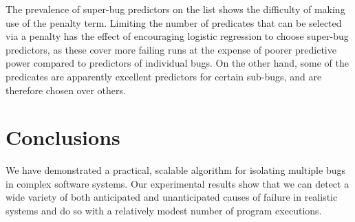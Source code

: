 \documentclass[draft]{sig-alternate}
\newcommand{\issue}[2][]{}
\begin{document}
The prevalence of super-bug predictors on the list shows the
difficulty of making use of the penalty term.  Limiting the number of
predicates that can be selected via a penalty has the effect of
encouraging logistic regression to choose super-bug predictors, as
these cover more failing runs at the expense of poorer predictive
power compared to predictors of individual bugs.  On the other hand,
some of the predicates are apparently excellent predictors for certain
sub-bugs, and are therefore chosen over others.

\issue[Alice]{I changed the justification for why sub-bug predictors
  are selected.  We don't relax the regularization penalty during log
  reg training, but I think sub-bug predictors are selected because
  they are really good predictors for certain subsets of failed runs.
  [text modified]}

\section{Conclusions}
\label{sec:conclusions}

We have demonstrated a practical, scalable algorithm for isolating multiple bugs
in complex software systems.  Our experimental results show that we can
detect a wide variety of both anticipated and unanticipated causes of failure
in realistic systems and do so with a relatively modest number of program
executions.

\issue[Mayur]{Add one or two lines about future work to the end of the
  conclusions section:

  (1) tracking predicates about the heap structure (remember
  rhythmbox)
  
  (2) creating counterexamples (traces) from predicates by using
  static analysis (will ward off any criticism that predicates aren't
  always sufficient)}

\issue[Alex]{For (2) I don't think we have anything intelligent to say
  about how to do that, so I'd rather not mention it.}

{\small

}
\end{document}
